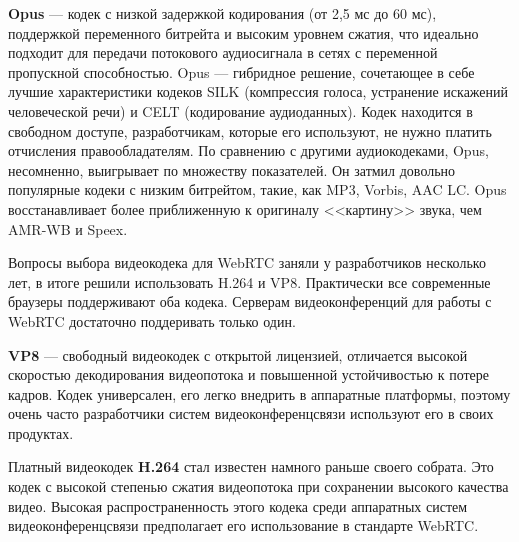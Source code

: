 \textbf{Opus} --- кодек с низкой задержкой кодирования (от 2{,}5 мс до 60 мс),
поддержкой переменного битрейта и высоким уровнем сжатия, 
что идеально подходит для передачи потокового аудиосигнала в сетях с
переменной пропускной способностью. 
Opus --- гибридное решение, сочетающее в себе лучшие характеристики кодеков SILK
(компрессия голоса, устранение искажений человеческой речи) и CELT
(кодирование аудиоданных). 
Кодек находится в свободном доступе, разработчикам, которые его используют,
не нужно платить отчисления правообладателям. 
По сравнению с другими аудиокодеками, Opus, несомненно, выигрывает по множеству показателей.
Он затмил довольно популярные кодеки с низким битрейтом, такие, как MP3, Vorbis, AAC LC.
Opus восстанавливает более приближенную к оригиналу <<картину>> звука, 
чем AMR-WB и Speex.

Вопросы выбора видеокодека для WebRTC заняли у разработчиков несколько лет,
в итоге решили использовать H.264 и VP8. 
Практически все современные браузеры поддерживают оба кодека.
Серверам видеоконференций для работы с WebRTC достаточно поддеривать только один.

\textbf{VP8} --- свободный видеокодек с открытой лицензией,
отличается высокой скоростью декодирования видеопотока и повышенной устойчивостью к
потере кадров.
Кодек универсален, его легко внедрить в аппаратные платформы, 
поэтому очень часто разработчики систем видеоконференцсвязи используют его 
в своих продуктах.

Платный видеокодек \textbf{H.264} стал известен намного раньше своего собрата.
Это кодек с высокой степенью сжатия видеопотока при сохранении высокого качества видео.
Высокая распространенность этого кодека среди аппаратных систем
видеоконференцсвязи предполагает его использование в стандарте WebRTC.